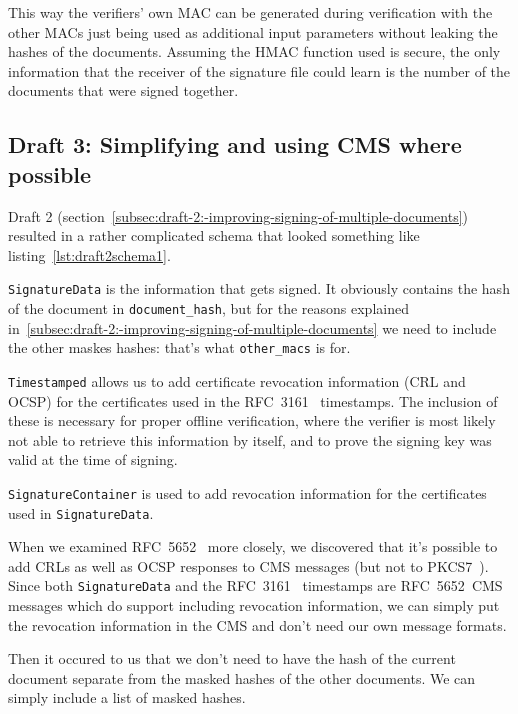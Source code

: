 This way the verifiers' own \gls{MAC} can be generated during verification with the other \gls{MAC}s just being used as additional input parameters without leaking the hashes of the documents.
Assuming the \gls{HMAC} function used is secure,
the only information that the receiver of the signature file could learn is the number of the documents that were signed together.

\subsection{Draft 3: Simplifying and using CMS where possible}\label{subsec:draft-3:-simplifying-and-using-cms-where-possible}
Draft 2 (section~\ref{subsec:draft-2:-improving-signing-of-multiple-documents})
resulted in a rather complicated schema that looked something like listing~\ref{lst:draft2schema1}.



\texttt{SignatureData} is the information that gets signed.
It obviously contains the hash of the document in \texttt{document\_hash},
but for the reasons explained in~\ref{subsec:draft-2:-improving-signing-of-multiple-documents}
we need to include the other maskes hashes: that's what \texttt{other\_macs} is for.

\texttt{Timestamped} allows us to add certificate revocation information (\gls{CRL} and \gls{OCSP}) for the certificates used in the RFC~3161~\cite{rfc3161} timestamps.
The inclusion of these is necessary for proper offline verification, where the verifier is most likely not able to retrieve this information by itself,
and to prove the signing key was valid at the time of signing.

\texttt{SignatureContainer} is used to add revocation information for the certificates used in \texttt{SignatureData}.

When we examined RFC~5652~\cite{rfc5652} more closely, we discovered that it's possible to add
\gls{CRL}s as well as \gls{OCSP} responses to \gls{CMS} messages (but not to \gls{PKCS7}~\cite[Section 10.2.1, RevocationInfoChoices and OtherRevocationInfoFormat]{rfc5652}).
Since both \texttt{SignatureData} and the RFC~3161~\cite{rfc3161} timestamps are RFC~5652~\gls{CMS} messages which do support including revocation information,
we can simply put the revocation information in the \gls{CMS} and don't need our own message formats.

Then it occured to us that we don't need to have the hash of the current document separate from the masked hashes of the other documents.
We can simply include a list of masked hashes.

